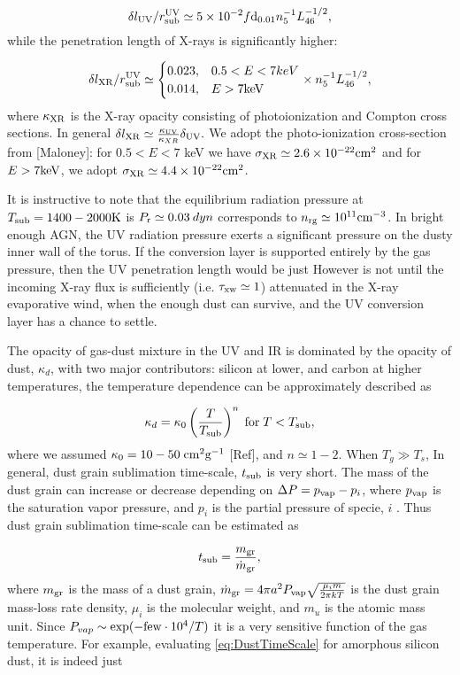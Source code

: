 \documentclass[12pt,english,preprint]{aastex}
\begin{document}
\[
\delta l_{{\rm UV}}/r_{{\rm sub}}^{{\rm UV}}\simeq5\times10^{-2}f{\rm d}_{0.01}n_{5}^{-1}L_{46}^{-1/2}\mbox{,}
\]
while the penetration length of
X-rays is significantly higher:

\[
\delta l_{{\rm XR}}/r_{{\rm sub}}^{{\rm UV}}\simeq\begin{cases}
0.023, & 0.5<E<7keV\\
0.014, & E>7{\rm keV}
\end{cases}\times n_{5}^{-1}L_{46}^{-1/2},
\]
where $\kappa_{{\rm XR}}$ is the X-ray opacity consisting of photoionization
and Compton cross sections. In general $\delta l_{{\rm XR}}\simeq\frac{\kappa_{{\rm UV}}}{\kappa_{XR}}\delta_{{\rm UV}}.$
We adopt the photo-ionization cross-section from {[}Maloney{]}: for
$0.5<E<7$ keV we have $\sigma_{{\rm XR}}\simeq2.6\times10^{-22}\text{cm}^{2}$
and for $E>7{\rm keV}$, we adopt $\sigma_{{\rm XR}}\simeq4.4\times10^{-22}\text{cm}^{2}$.

It is instructive to note that the equilibrium radiation pressure
at $T_{{\rm sub}}=1400-2000{\rm K}$ is $P_{{\rm r}}\simeq0.03\:dyn$
corresponds to $n_{{\rm rg}}\simeq10^{11}{\rm cm}^{-3}$. In bright
enough AGN, the UV radiation pressure exerts a significant pressure
on the dusty inner wall of the torus. If the conversion layer is supported
entirely by the gas pressure, then the UV penetration length would
be just However is not until the incoming X-ray flux is sufficiently
(i.e. $\tau_{{\rm xw}}\simeq1$) attenuated in the X-ray evaporative
wind, when the enough dust can survive, and the UV conversion layer
has a chance to settle.

The opacity of gas-dust mixture in the UV and IR is dominated by the
opacity of dust, $\kappa_{d}$, with two major contributors: silicon
at lower, and carbon at higher temperatures, the temperature dependence
can be approximately described as

\[
\kappa_{d}=\kappa_{0}\left(\frac{T}{T_{{\rm sub}}}\right)^{n}\;{\rm for}\;T<T_{{\rm sub}},
\]
where we assumed $\kappa_{0}=10-50\;{\rm cm}^{2}\textrm{g}^{-1}$
{[}Ref{]}, and $n\simeq1-2.$ When $T_{g}\gg T_{s}$, In general,
dust grain sublimation time-scale, $t_{{\rm sub}}$ is very short.
The mass of the dust grain can increase or decrease depending on $\Delta P=p_{{\rm vap}}-p_{i}$,
where $p_{{\rm vap}}$ is the saturation vapor pressure, and $p_{i}$
is the partial pressure of specie, $i$ \citep{Phinney89}. Thus dust grain
sublimation time-scale can be estimated as

\begin{equation}
t_{{\rm sub}}=\frac{m_{{\rm gr}}}{\dot{m}_{{\rm gr}}},\label{eq:DustTimeScale}
\end{equation}
where $m_{{\rm gr}}$ is the mass of a dust grain, $\dot{m}_{{\rm gr}}=4\pi a^{2}P_{{\rm vap}}\sqrt{\frac{\mu_{i}m}{2\pi kT}}$
is the dust grain mass-loss rate density, $\mu_{i}$ is the molecular
weight, and $m_{u}$ is the atomic mass unit. Since $P_{vap}\sim\exp(-{\rm few}\cdot10^{4}/T)$
it is a very sensitive function of the gas temperature. For example,
evaluating \eqref{eq:DustTimeScale} for amorphous silicon dust, it
is indeed just
\end{document}
